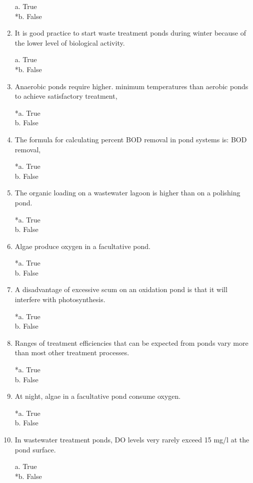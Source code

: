 \begin{enumerate}
a. True \\
*b. False 


\item  It is good practice to start waste treatment ponds during winter because of the lower level of biological activity. 

a. True \\
*b. False 


\item  Anaerobic ponds require higher. minimum temperatures than aerobic ponds to achieve satisfactory treatment, 

*a. True \\
b. False 


\item  The formula for calculating percent BOD removal in pond systems is: BOD removal, %

*a. True \\
b. False 


\item  The organic loading on a wastewater lagoon is higher than on a polishing pond. 

*a. True \\
b. False 


\item  Algae produce oxygen in a facultative pond. 

*a. True \\
b. False 


\item  A disadvantage of excessive scum on an oxidation pond is that it will interfere with photosynthesis. 

*a. True \\
b. False 


\item  Ranges of treatment efficiencies that can be expected from ponds vary more than most other treatment processes. 

*a. True \\
b. False 


\item  At night, algae in a facultative pond consume oxygen. 

*a. True \\
b. False 


\item  In wastewater treatment ponds, DO levels very rarely exceed 15 mg/l at the pond surface. 

a. True \\
*b. False 



\end{enumerate}
